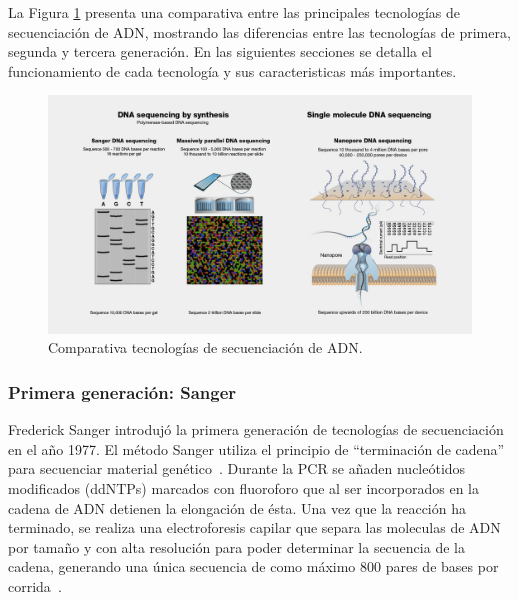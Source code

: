 
La Figura \ref{fig:DNA_sequencing} presenta una comparativa entre las principales tecnologías de secuenciación de ADN, mostrando las diferencias entre las tecnologías de primera, segunda y tercera generación. En las siguientes secciones se detalla el funcionamiento de cada tecnología y sus caracteristicas más importantes.
\begin{figure}[H]
    \centering
    \includegraphics[width=1\linewidth]{images/DNA-Sequencing.jpg}
    \caption[Comparativa tecnologías de secuenciación]{Comparativa tecnologías de secuenciación de ADN\protect\footnotemark.}
    \label{fig:DNA_sequencing}
\end{figure}
\subsubsection{Primera generación: Sanger}
Frederick Sanger introdujó la primera generación de tecnologías de secuenciación en el año 1977. El método Sanger utiliza el principio de ``terminación de cadena'' para secuenciar material genético~\cite{sanger1975rapid}. 
Durante la PCR se añaden nucleótidos modificados (ddNTPs) marcados con fluoroforo que al ser incorporados en la cadena de ADN detienen la elongación de ésta. Una vez que la reacción ha terminado, se realiza una electroforesis capilar que separa las moleculas de ADN por tamaño y con alta resolución para poder determinar la secuencia de la cadena, generando una única secuencia de como máximo 800 pares de bases por corrida~\cite{crossley2020guidelines}.

